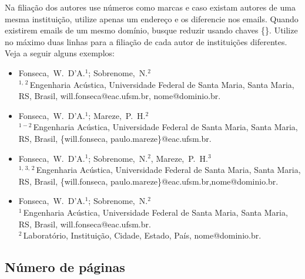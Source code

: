 \documentclass[12pt, a4paper, twoside, twocolumn]{article}
\begin{document}
Na filiação dos autores use números como marcas e caso existam autores de uma mesma instituição, utilize apenas um endereço e os diferencie nos emails. Quando existirem emails de um mesmo domínio, busque reduzir usando chaves \{\}. Utilize no máximo duas linhas para a filiação de cada autor de instituições diferentes. Veja a seguir alguns  exemplos:
%
\begin{flushleft}
\vspace{-0.25\baselineskip}
\begin{itemize}[topsep=-1ex,align=left,leftmargin=0.2cm] \itemsep=4pt

	\item Fonseca,~W.~D'A.$^1$; Sobrenome,~N.$^2$\\[6pt]	
	$^{1,\,2}$\,Engenharia Acústica, Universidade Federal de Santa Maria, Santa Maria, RS, Brasil,\linebreak 
	 will.fonseca@eac.ufsm.br, nome@dominio.br.
	
	\item Fonseca,~W.~D'A.$^1$; Mareze,~P.~H.$^2$\\[6pt]	
	$^{1-2}$\,Engenharia Acústica, Universidade Federal de Santa Maria, Santa Maria, RS, Brasil,
	\{will.fonseca, paulo.mareze\}@eac.ufsm.br.
	
	\item Fonseca,~W.~D'A.$^1$; Sobrenome,~N.$^2$, Mareze,~P.~H.$^3$\\[6pt]	
	$^{1,\,3,\,2}$\,Engenharia Acústica, Universidade Federal de Santa Maria, Santa Maria, RS, Brasil,
	\{will.fonseca, paulo.mareze\}@eac.ufsm.br,\linebreak nome@dominio.br.

	\item Fonseca,~W.~D'A.$^1$; Sobrenome,~N.$^2$\\[6pt]	
	$^{1}$\,Engenharia Acústica, Universidade Federal de Santa Maria, Santa Maria, RS, Brasil,
	will.fonseca@eac.ufsm.br.\\[4pt]		
	$^2$\,Laboratório, Instituição, Cidade, Estado, País, nome@dominio.br.	
\end{itemize}
\vspace{-0.4\baselineskip}
\end{flushleft}

	
\subsection{Número de páginas}
\end{document}
